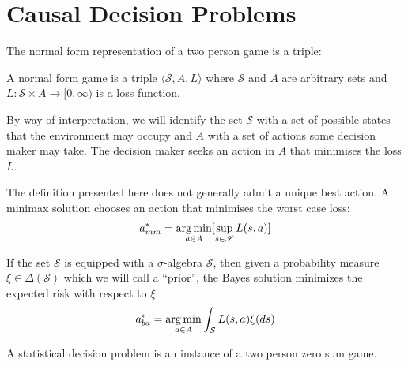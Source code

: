 \section{Causal Decision Problems}

The normal form representation of a two person game is a triple:

\begin{definition}
A normal form game is a triple $\langle \mathscr{S}, A, L\rangle$ where $\mathscr{S}$ and $A$ are arbitrary sets and $L:\mathscr{S}\times A\to [0,\infty)$ is a loss function.

By way of interpretation, we will identify the set $\mathscr{S}$ with a set of possible states that the environment may occupy and $A$ with a set of actions some decision maker may take. The decision maker seeks an action in $A$ that minimises the loss $L$.
\end{definition}

The definition presented here does not generally admit a unique best action. A minimax solution chooses an action that minimises the worst case loss:
\begin{align}
    a^*_{mm} = \operatorname*{arg\,min}_{a\in A} [\sup_{s\in \mathscr{S}} L(s,a)]\label{eq:mm_soln}
\end{align}

If the set $\mathscr{S}$ is equipped with a $\sigma$-algebra $\mathcal{S}$, then given a probability measure $\xi\in \Delta(\mathcal{S})$ which we will call a ``prior'', the Bayes solution minimizes the expected risk with respect to $\xi$:
\begin{align}
    a^*_{ba} = \operatorname*{arg\,min}_{a\in A} \int_{\mathcal{S}} L(s,a) \xi(ds)
\end{align}

A statistical decision problem is an instance of a two person zero sum game.

